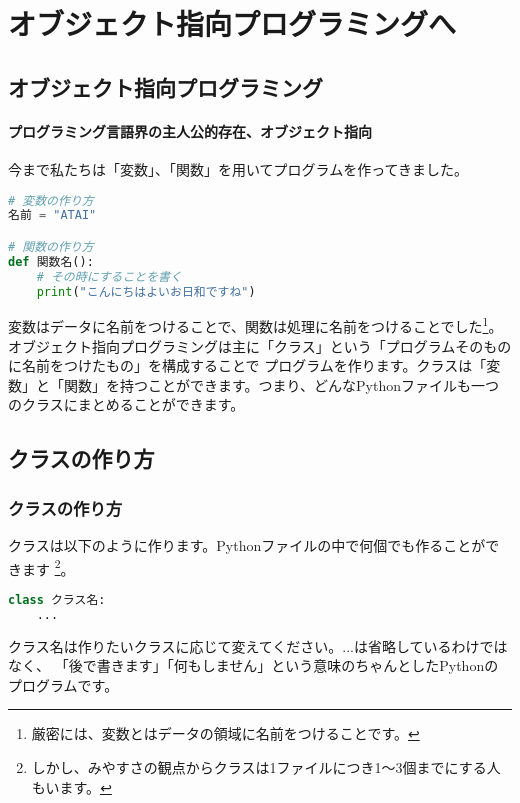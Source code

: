 \chapter{オブジェクト指向プログラミングへ}\label{ch:3}
\section{オブジェクト指向プログラミング}
\subsubsection{プログラミング言語界の主人公的存在、オブジェクト指向}
今まで私たちは「変数」、「関数」を用いてプログラムを作ってきました。
\begin{lstlisting}[caption=復習,label=sample, language=Python]
# 変数の作り方
名前 = "ATAI"

# 関数の作り方
def 関数名():
    # その時にすることを書く
    print("こんにちはよいお日和ですね")
\end{lstlisting}
変数はデータに名前をつけることで、関数は処理に名前をつけることでした\footnote{厳密には、変数とはデータの領域に名前をつけることです。}。
オブジェクト指向プログラミングは主に「クラス」という「プログラムそのものに名前をつけたもの」を構成することで
プログラムを作ります。クラスは「変数」と「関数」を持つことができます。つまり、どんなPythonファイルも一つのクラスにまとめることができます。
\section{クラスの作り方}
\subsection{クラスの作り方}
クラスは以下のように作ります。Pythonファイルの中で何個でも作ることができます
\footnote{しかし、みやすさの観点からクラスは1ファイルにつき1〜3個までにする人もいます。}。
\newpage
\begin{lstlisting}[caption=クラスの作り方,label=sample, language=Python]
class クラス名:
    ...
\end{lstlisting}
クラス名は作りたいクラスに応じて変えてください。...は省略しているわけではなく、
「後で書きます」「何もしません」という意味のちゃんとしたPythonのプログラムです。

